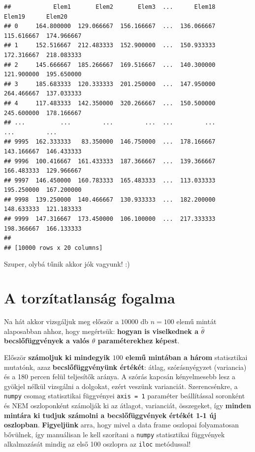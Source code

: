 \documentclass[
]{book}
\begin{document}
\begin{verbatim}
##            Elem1       Elem2       Elem3  ...      Elem18      Elem19      Elem20
## 0     164.800000  129.066667  156.166667  ...  136.066667  115.616667  174.966667
## 1     152.516667  212.483333  152.900000  ...  150.933333  172.316667  218.083333
## 2     145.666667  185.266667  169.516667  ...  140.300000  121.900000  195.650000
## 3     185.683333  120.333333  201.250000  ...  147.950000  264.466667  137.033333
## 4     117.483333  142.350000  320.266667  ...  150.500000  245.600000  178.166667
## ...          ...         ...         ...  ...         ...         ...         ...
## 9995  162.333333   83.350000  146.750000  ...  178.166667  143.166667  146.433333
## 9996  100.416667  161.433333  187.366667  ...  139.366667  166.483333  129.966667
## 9997  146.450000  160.783333  165.483333  ...  113.033333  195.250000  167.200000
## 9998  139.250000  140.466667  130.933333  ...  182.200000  148.633333  121.183333
## 9999  147.316667  173.450000  106.100000  ...  217.333333  198.366667  166.133333
## 
## [10000 rows x 20 columns]
\end{verbatim}

Szuper, olybá tűnik akkor jók vagyunk! :)

\section{A torzítatlanság fogalma}\label{a-torzuxedtatlansuxe1g-fogalma}

Na hát akkor vizsgáljuk meg először a \(10000\) db \(n=100\) elemű mintát alaposabban ahhoz, hogy megértsük: \textbf{hogyan is viselkednek a \(\hat{\theta}\) becslőfüggvények a valós \(\theta\) paraméterekhez képest}.

Először \textbf{számoljuk ki mindegyik \(100\) elemű mintában a három} statisztikai mutatónk, azaz \textbf{becslőfüggvényünk értékét}: átlag, szórásnyégyzet (variancia) és a 180 percen felül teljesítők aránya. A szórás kapcsán kényelmesebb lesz a gyökjel nélkül vizsgálni a dolgokat, ezért veszünk varianciát.
Szerencsénkre, a \texttt{numpy} csomag statisztikai függvényei \texttt{axis\ =\ 1} paraméter beállítással soronként és NEM oszloponként számolják ki az átlagot, varianciát, összegeket, így \textbf{minden mintára ki tudjuk számolni a becslőfüggvények értékét 1-1 új oszlopban}. \textbf{Figyeljünk} arra, hogy mivel a data frame oszlopai folyamatosan bővülnek, így manuálisan le kell szorítani a \texttt{numpy} statisztikai függvények alkalmazását mindig az első 100 oszlopra az \texttt{iloc} metódussal!
\end{document}
